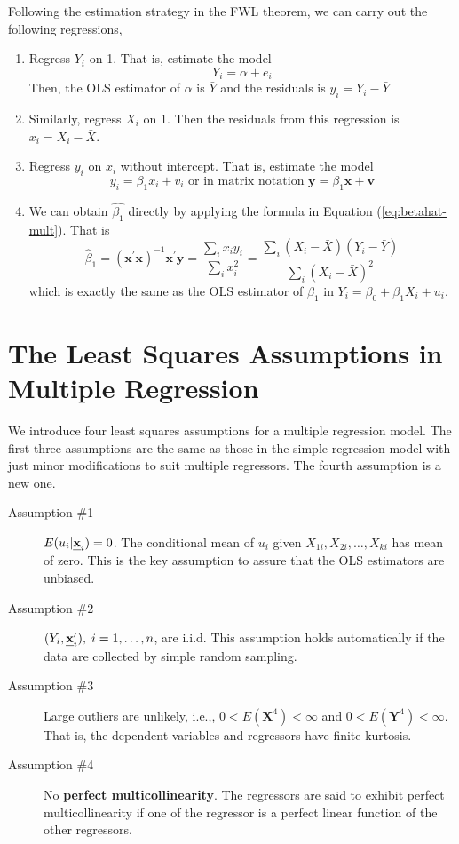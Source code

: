 \documentclass[a4paper,11pt]{article}
\def\mathbi#1{\textbf{\em #1}}
\begin{document}
Following the estimation strategy in the FWL theorem, we can carry out
the following regressions,
\begin{enumerate}
\item Regress \(Y_i\) on 1. That is, estimate the model
\[ Y_i = \alpha + e_i \]
Then, the OLS estimator of \(\alpha\) is
\(\bar{Y}\) and the residuals is \(y_i = Y_i - \bar{Y}\)
\item Similarly, regress \(X_{i}\) on 1. Then
the residuals from this regression is \(x_{i} = X_{i} -
   \bar{X}\).
\item Regress \(y_i\) on \(x_{i}\) without intercept. That is,
estimate the model
\[ y_i = \beta_1 x_{i} + v_i \text{ or in matrix notation }
   \mathbf{y} = \beta_1 \mathbf{x} + \mathbf{v} \]
\item We can obtain \(\hat{\beta_1}\) directly by applying the formula in
Equation (\ref{eq:betahat-mult}). That is
\[ \hat{\beta}_1 = (\mathbf{x}^{\prime} \mathbf{x})^{-1}
   \mathbf{x}^{\prime} \mathbf{y} = \frac{\sum_i x_{i} y_i}{\sum_i
   x_{i}^2} = \frac{\sum_i (X_i-\bar{X})(Y_i-\bar{Y})}{\sum_i(X_i-\bar{X})^2} \]
which is exactly the same as the OLS estimator of \(\beta_1\) in \(Y_i
   = \beta_0 + \beta_1 X_i + u_i\).
\end{enumerate}


\section{The Least Squares Assumptions in Multiple Regression}
\label{sec:orgbec3fef}

We introduce four least squares assumptions for a multiple regression
model. The first three assumptions are the same as those in the
simple regression model with just minor modifications to suit multiple
regressors. The fourth assumption is a new one.

\begin{description}
\item[{Assumption \#1}] \(E(u_i | \mathbi{x}_i) = 0\). The conditional mean
of \(u_i\) given \(X_{1i}, X_{2i}, \ldots, X_{ki}\) has
mean of zero. This is the key assumption to assure
that the OLS estimators are unbiased.

\item[{Assumption \#2}] \((Y_i, \mathbi{x}_i^{\prime}),\; i=1, \ldots, n\), are
i.i.d. This assumption holds automatically if the
data are collected by simple random sampling.

\item[{Assumption \#3}] Large outliers are unlikely, i.e.,, \(0 <
                   E(\mathbf{X}^4) < \infty\) and \(0 < E(\mathbf{Y}^4)
                   < \infty\). That is, the dependent variables and
regressors have finite kurtosis.
\item[{Assumption \#4}] No \textbf{perfect multicollinearity}. The regressors are
said to exhibit perfect multicollinearity if one of
the regressor is a perfect linear function of the
other regressors.
\end{description}
\end{document}
